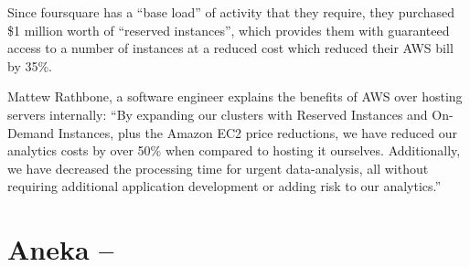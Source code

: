 Since foursquare has a ``base load'' of activity that they require, they purchased \$1 million worth of ``reserved instances'', which provides them with guaranteed access to a number of instances at a reduced cost which reduced their AWS bill by 35\%.  

Mattew Rathbone, a software engineer explains the benefits of AWS over hosting servers internally: ``By expanding our clusters with Reserved Instances and On-Demand Instances, plus the Amazon EC2 price reductions, we have reduced our analytics costs by over 50\% when compared to hosting it ourselves. Additionally, we have decreased the processing time for urgent data-analysis, all without requiring additional application development or adding risk to our analytics.''\ftSAmTwo
\ftSAmTwoText

\section{Aneka -- }
